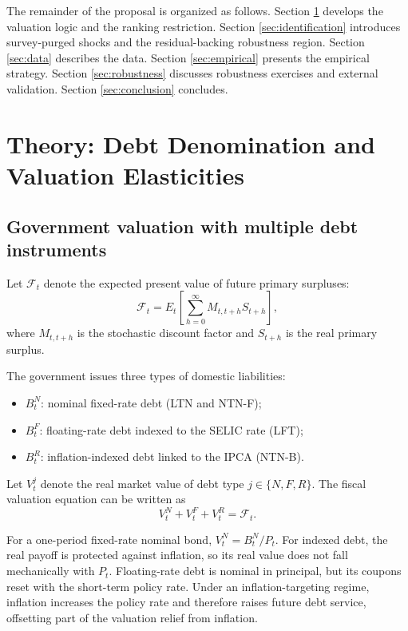 \documentclass[12pt,a4paper]{article}
\begin{document}
The remainder of the proposal is organized as follows. Section \ref{sec:theory} develops the valuation logic and the ranking restriction. Section \ref{sec:identification} introduces survey-purged shocks and the residual-backing robustness region. Section \ref{sec:data} describes the data. Section \ref{sec:empirical} presents the empirical strategy. Section \ref{sec:robustness} discusses robustness exercises and external validation. Section \ref{sec:conclusion} concludes.

\section{Theory: Debt Denomination and Valuation Elasticities}
\label{sec:theory}

\subsection{Government valuation with multiple debt instruments}

Let \(\mathcal{F}_t\) denote the expected present value of future primary surpluses:
\begin{equation}
\mathcal{F}_t
=
E_t\left[\sum_{h=0}^{\infty} M_{t,t+h} S_{t+h}\right],
\label{eq:fiscal_backing}
\end{equation}
where \(M_{t,t+h}\) is the stochastic discount factor and \(S_{t+h}\) is the real primary surplus.

The government issues three types of domestic liabilities:
\begin{itemize}[leftmargin=1.2cm]
    \item \(B_t^N\): nominal fixed-rate debt (LTN and NTN-F);
    \item \(B_t^F\): floating-rate debt indexed to the SELIC rate (LFT);
    \item \(B_t^R\): inflation-indexed debt linked to the IPCA (NTN-B).
\end{itemize}

Let \(V_t^j\) denote the real market value of debt type \(j\in\{N,F,R\}\). The fiscal valuation equation can be written as
\begin{equation}
V_t^N+V_t^F+V_t^R=\mathcal{F}_t.
\label{eq:valuation_equation}
\end{equation}

For a one-period fixed-rate nominal bond, \(V_t^N=B_t^N/P_t\). For indexed debt, the real payoff is protected against inflation, so its real value does not fall mechanically with \(P_t\). Floating-rate debt is nominal in principal, but its coupons reset with the short-term policy rate. Under an inflation-targeting regime, inflation increases the policy rate and therefore raises future debt service, offsetting part of the valuation relief from inflation.
\end{document}
